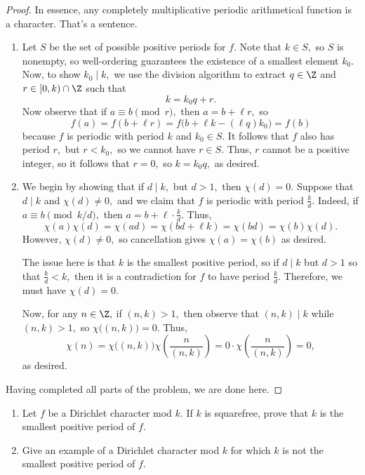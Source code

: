 \begin{proof}
In essence, any completely multiplicative periodic arithmetical function is a character. That's a sentence.
\begin{enumerate}[label=(\alph*)]
    \item Let $S$ be the set of possible positive periods for $f.$ Note that $k\in S,$ so $S$ is nonempty, so well-ordering guarantees the existence of a smallest element $k_0.$ Now, to show $k_0\mid k,$ we use the division algorithm to extract $q\in\Z$ and $r\in[0,k)\cap\Z$ such that
    \[k=k_0q+r.\]
    Now observe that if $a\equiv b\pmod r,$ then $a=b+\ell r,$ so
    \[f(a)=f(b+\ell r)=f\big(b+\ell k-(\ell q)k_0\big)=f(b)\]
    because $f$ is periodic with period $k$ and $k_0\in S.$ It follows that $f$ also has period $r,$ but $r<k_0,$ so we cannot have $r\in S.$ Thus, $r$ cannot be a positive integer, so it follows that $r=0,$ so $k=k_0q,$ as desired.
    \item We begin by showing that if $d\mid k,$ but $d>1,$ then $\chi(d)=0.$ Suppose that $d\mid k$ and $\chi(d)\ne0,$ and we claim that $f$ is periodic with period $\frac kd.$ Indeed, if $a\equiv b\pmod{k/d},$ then $a=b+\ell\cdot\frac kd.$ Thus,
    \[\chi(a)\chi(d)=\chi(ad)=\chi(bd+\ell k)=\chi(bd)=\chi(b)\chi(d).\]
    However, $\chi(d)\ne0,$ so cancellation gives $\chi(a)=\chi(b)$ as desired.
    
    The issue here is that $k$ is the smallest positive period, so if $d\mid k$ but $d>1$ so that $\frac kd<k,$ then it is a contradiction for $f$ to have period $\frac kd.$ Therefore, we must have $\chi(d)=0.$
    
    Now, for any $n\in\Z,$ if $(n,k)>1,$ then observe that $(n,k)\mid k$ while $(n,k)>1,$ so $\chi\big((n,k)\big)=0.$ Thus,
    \[\chi(n)=\chi\big((n,k)\big)\chi\left(\frac n{(n,k)}\right)=0\cdot\chi\left(\frac n{(n,k)}\right)=0,\]
    as desired.
\end{enumerate}
Having completed all parts of the problem, we are done here.
\end{proof}

\begin{exercise}
\begin{enumerate}[label=(\alph*)]
    \item Let $f$ be a Dirichlet character mod $k.$ If $k$ is squarefree, prove that $k$ is the smallest positive period of $f.$
    \item Give an example of a Dirichlet character mod $k$ for which $k$ is not the smallest positive period of $f.$
\end{enumerate}
\end{exercise}

